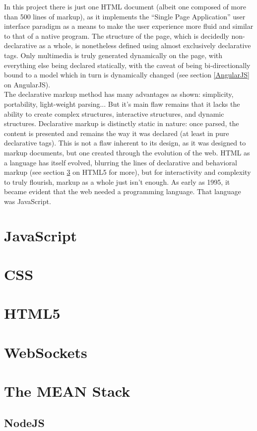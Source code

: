 In this project there is just one HTML document (albeit one composed of more than 500 lines of markup), as it implements the ``Single Page Application'' user interface paradigm as a means to make the user experience more fluid and similar to that of a native program. The structure of the page, which is decidedly non-declarative as a whole, is nonetheless defined using almost exclusively declarative tags. Only multimedia is truly generated dynamically on the page, with everything else being declared statically, with the caveat of being bi-directionally bound to a model which in turn is dynamically changed (see section \ref{AngularJS} on AngularJS).\\

The declarative markup method has many advantages as shown: simplicity, portability, light-weight parsing... But it's main flaw remains that it lacks the ability to create complex structures, interactive structures, and dynamic structures. Declarative markup is distinctly static in nature: once parsed, the content is presented and remains the way it was declared (at least in pure declarative tags). This is not a flaw inherent to its design, as it was designed to markup documents, but one created through the evolution of the web. HTML as a language has itself evolved, blurring the lines of declarative and behavioral markup (see section \ref{HTML5} on HTML5 for more), but for interactivity and complexity to truly flourish, markup as a whole just isn't enough. As early as 1995, it became evident that the web needed a programming language. That language was JavaScript.
\section{JavaScript}
\section{CSS}
\section{HTML5} \label{HTML5}
\section{WebSockets}
\section{The MEAN Stack}
\subsection{NodeJS}
